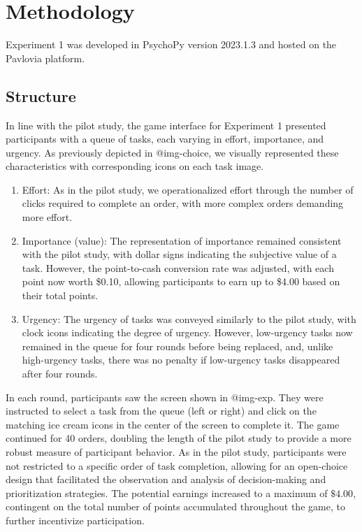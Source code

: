 \documentclass[
]{report}
\begin{document}
\hypertarget{methodology-1}{%
\section{Methodology}\label{methodology-1}}

Experiment 1 was developed in PsychoPy version 2023.1.3 and hosted on
the Pavlovia platform.

\hypertarget{structure-1}{%
\subsection{Structure}\label{structure-1}}

In line with the pilot study, the game interface for Experiment 1
presented participants with a queue of tasks, each varying in effort,
importance, and urgency. As previously depicted in @img-choice, we
visually represented these characteristics with corresponding icons on
each task image.

\begin{enumerate}
\def\labelenumi{\arabic{enumi}.}
\item
  Effort: As in the pilot study, we operationalized effort through the
  number of clicks required to complete an order, with more complex
  orders demanding more effort.
\item
  Importance (value): The representation of importance remained
  consistent with the pilot study, with dollar signs indicating the
  subjective value of a task. However, the point-to-cash conversion rate
  was adjusted, with each point now worth \$0.10, allowing participants
  to earn up to \$4.00 based on their total points.
\item
  Urgency: The urgency of tasks was conveyed similarly to the pilot
  study, with clock icons indicating the degree of urgency. However,
  low-urgency tasks now remained in the queue for four rounds before
  being replaced, and, unlike high-urgency tasks, there was no penalty
  if low-urgency tasks disappeared after four rounds.
\end{enumerate}

In each round, participants saw the screen shown in @img-exp. They were
instructed to select a task from the queue (left or right) and click on
the matching ice cream icons in the center of the screen to complete it.
The game continued for 40 orders, doubling the length of the pilot study
to provide a more robust measure of participant behavior. As in the
pilot study, participants were not restricted to a specific order of
task completion, allowing for an open-choice design that facilitated the
observation and analysis of decision-making and prioritization
strategies. The potential earnings increased to a maximum of \(\$4.00\),
contingent on the total number of points accumulated throughout the
game, to further incentivize participation.
\end{document}
